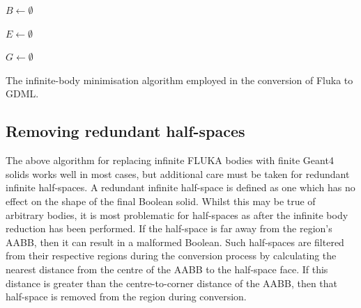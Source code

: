 \documentclass[final,5p,times,twocolumn]{elsarticle}
\begin{document}
\begin{algorithm}





  $ B \longleftarrow \emptyset$

  $ E \longleftarrow \emptyset$\;

  $ G \longleftarrow \emptyset$ \;

  \label{algo:redundant-halfspace}
  \caption{The infinite-body minimisation algorithm employed in the
    conversion of Fluka to GDML.}
\end{algorithm}


\subsection{Removing redundant half-spaces}
The above algorithm for replacing infinite FLUKA bodies with finite
Geant4 solids works well in most cases, but additional care must be
taken for redundant infinite half-spaces.  A redundant infinite half-space
is defined as one which has no effect on the shape of the
final Boolean solid.  Whilst this may be true of arbitrary bodies, it
is most problematic for half-spaces as after the infinite body
reduction has been performed. If the half-space is far away from the
region's AABB, then it can result in a malformed Boolean. Such
half-spaces are filtered from their respective regions during the
conversion process by calculating the nearest distance from the centre
of the AABB to the half-space face.  If this distance is greater than
the centre-to-corner distance of the AABB, then that half-space is
removed from the region during conversion.
\end{document}
